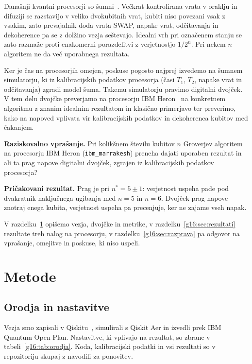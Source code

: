 Današnji kvantni procesorji so šumni~\cite{preskill2018}. Večkrat kontrolirana vrata v oraklju in difuziji se razstavijo v veliko dvokubitnih vrat, kubiti niso povezani vsak z vsakim, zato prevajalnik doda vrata SWAP, napake vrat, odčitavanja in dekoherence pa se z dolžino vezja seštevajo. Idealni vrh pri označenem stanju se zato razmaže proti enakomerni porazdelitvi z verjetnostjo $1/2^n$. Pri nekem $n$ algoritem ne da več uporabnega rezultata.

Ker je čas na procesorjih omejen, poskuse pogosto najprej izvedemo na šumnem simulatorju, ki iz kalibracijskih podatkov procesorja (časi $T_1$, $T_2$, napake vrat in odčitavanja) zgradi model šuma. Takemu simulatorju pravimo digitalni dvojček. V tem delu dvojčke preverjamo na procesorju IBM Heron~\cite{g16:ibm_processors} na konkretnem algoritmu z znanim idealnim rezultatom in klasično primerjavo ter preverimo, kako na napoved vplivata vir kalibracijskih podatkov in dekoherenca kubitov med čakanjem.

\begin{svgraybox}
\textbf{Raziskovalno vprašanje.} Pri kolikšnem številu kubitov $n$ Groverjev algoritem na procesorju IBM Heron (\texttt{ibm\_marrakesh}) preneha dajati uporaben rezultat in ali ta prag napove digitalni dvojček, zgrajen iz kalibracijskih podatkov procesorja?

\textbf{Pričakovani rezultat.} Prag je pri $n^* = 5 \pm 1$: verjetnost uspeha pade pod dvakratnik naključnega ugibanja med $n = 5$ in $n = 6$. Dvojček prag napove znotraj enega kubita, verjetnost uspeha pa precenjuje, ker ne zajame vseh napak.
\end{svgraybox}

V razdelku~\ref{g16:sec:metode} opišemo vezja, dvojčke in metrike, v razdelku~\ref{g16:sec:rezultati} rezultate treh nalog na procesorju, v razdelku~\ref{g16:sec:razprava} pa odgovor na vprašanje, omejitve in poskuse, ki niso uspeli.


\section{Metode}
\label{g16:sec:metode}

\subsection{Orodja in nastavitve}
\label{g16:sec:orodja}

Vezja smo zapisali v Qiskitu~\cite{qiskit2024}, simulirali s Qiskit Aer in izvedli prek IBM Quantum Open Plan. Nastavitve, ki vplivajo na rezultat, so zbrane v tabeli~\ref{g16:tab:orodja}. Koda, kalibracijski podatki in vsi rezultati so v repozitoriju skupaj z navodili za ponovitev.

